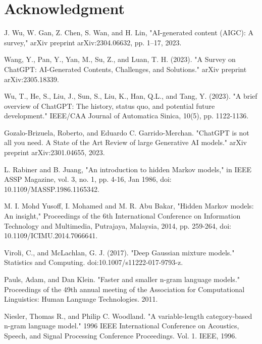 \documentclass[conference]{IEEEtran}
\begin{document}
\section*{Acknowledgment}





\begin{thebibliography}{00}
 J. Wu, W. Gan, Z. Chen, S. Wan, and H. Lin, "AI-generated content (AIGC): A survey," arXiv preprint arXiv:2304.06632, pp. 1–17, 2023.

 Wang, Y., Pan, Y., Yan, M., Su, Z., and Luan, T. H. (2023). "A Survey on ChatGPT: AI-Generated Contents, Challenges, and Solutions." arXiv preprint arXiv:2305.18339.

 Wu, T., He, S., Liu, J., Sun, S., Liu, K., Han, Q.L., and Tang, Y. (2023). "A brief overview of ChatGPT: The history, status quo, and potential future development." IEEE/CAA Journal of Automatica Sinica, 10(5), pp. 1122-1136.

 Gozalo-Brizuela, Roberto, and Eduardo C. Garrido-Merchan. "ChatGPT is not all you need. A State of the Art Review of large Generative AI models." arXiv preprint arXiv:2301.04655, 2023.

 L. Rabiner and B. Juang, "An introduction to hidden Markov models," in IEEE ASSP Magazine, vol. 3, no. 1, pp. 4-16, Jan 1986, doi: 10.1109/MASSP.1986.1165342.

 M. I. Mohd Yusoff, I. Mohamed and M. R. Abu Bakar, "Hidden Markov models: An insight," Proceedings of the 6th International Conference on Information Technology and Multimedia, Putrajaya, Malaysia, 2014, pp. 259-264, doi: 10.1109/ICIMU.2014.7066641.

 Viroli, C., and McLachlan, G. J. (2017). "Deep Gaussian mixture models." Statistics and Computing. doi:10.1007/s11222-017-9793-z.

 Pauls, Adam, and Dan Klein. "Faster and smaller n-gram language models." Proceedings of the 49th annual meeting of the Association for Computational Linguistics: Human Language Technologies. 2011.

 Niesler, Thomas R., and Philip C. Woodland. "A variable-length category-based n-gram language model." 1996 IEEE International Conference on Acoustics, Speech, and Signal Processing Conference Proceedings. Vol. 1. IEEE, 1996.


\end{thebibliography}
\end{document}
